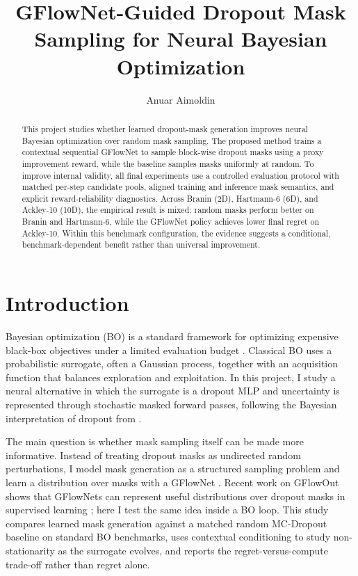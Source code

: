 \documentclass{article}
\title{GFlowNet-Guided Dropout Mask Sampling for Neural Bayesian Optimization}
\author{Anuar Aimoldin}
\date{}
\begin{document}
\maketitle

\begin{abstract}
This project studies whether learned dropout-mask generation improves neural Bayesian optimization over random mask sampling. The proposed method trains a contextual sequential GFlowNet to sample block-wise dropout masks using a proxy improvement reward, while the baseline samples masks uniformly at random. To improve internal validity, all final experiments use a controlled evaluation protocol with matched per-step candidate pools, aligned training and inference mask semantics, and explicit reward-reliability diagnostics. Across Branin (2D), Hartmann-6 (6D), and Ackley-10 (10D), the empirical result is mixed: random masks perform better on Branin and Hartmann-6, while the GFlowNet policy achieves lower final regret on Ackley-10. Within this benchmark configuration, the evidence suggests a conditional, benchmark-dependent benefit rather than universal improvement.
\end{abstract}

\section{Introduction}

Bayesian optimization (BO) is a standard framework for optimizing expensive black-box objectives under a limited evaluation budget \cite{snoek2012practical}. Classical BO uses a probabilistic surrogate, often a Gaussian process, together with an acquisition function that balances exploration and exploitation. In this project, I study a neural alternative in which the surrogate is a dropout MLP and uncertainty is represented through stochastic masked forward passes, following the Bayesian interpretation of dropout from \citet{gal2016dropout}.

The main question is whether mask sampling itself can be made more informative. Instead of treating dropout masks as undirected random perturbations, I model mask generation as a structured sampling problem and learn a distribution over masks with a GFlowNet \cite{bengio2023gflownet}. Recent work on GFlowOut shows that GFlowNets can represent useful distributions over dropout masks in supervised learning \cite{liu2023gflowout}; here I test the same idea inside a BO loop. This study compares learned mask generation against a matched random MC-Dropout baseline on standard BO benchmarks, uses contextual conditioning to study non-stationarity as the surrogate evolves, and reports the regret-versus-compute trade-off rather than regret alone.
\end{document}
